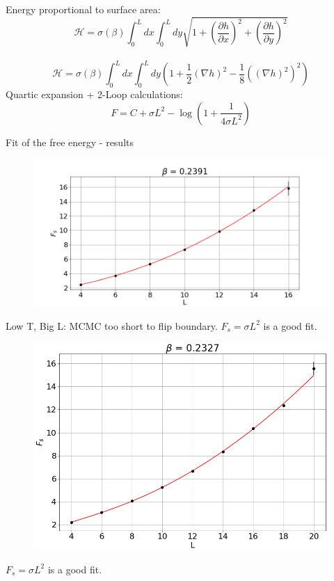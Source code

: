 \documentclass[12pt,handout]{beamer}
\begin{document}
\begin{frame}

\begin{center}
Energy proportional to surface area:
\[
\mathcal H = \sigma\left(\beta \right) \int _0 ^{L} dx \int _0 ^{L} dy \sqrt{1 + \left(\frac{\partial h}{\partial x}\right)^2 + \left(\frac{\partial h}{\partial y}\right)^2}
\]\\
\[
	\mathcal H  = \sigma\left(\beta \right) \int _0 ^{L} dx \int _0 ^{L} dy \left( 1 + \frac{1}{2}\left(\nabla{h}\right) ^2 - \frac{1}{8}\left(\left(\nabla{h}\right) ^2\right) ^2 \right)
\]
Quartic expansion + 2-Loop calculations:
\[
F = C + \sigma L ^2 - \log\left( 1 + \frac{1}{4\sigma L^2}\right)
\]
\end{center}
\end{frame}

\begin{frame}{Fit of the free energy - results}\begin{center}
\begin{figure}[!htb]
\centering
\includegraphics[scale=0.4, center]{02391.png}
\end{figure}
Low T, Big L: MCMC too short to flip boundary. $F_s = \sigma L^2$ is a good fit.
\end{center}
\end{frame}

\begin{frame}
\begin{center}
\begin{figure}[!htb]
\centering
\includegraphics[scale=0.4, center]{02327.png}
\end{figure}
$F_s = \sigma L^2$ is a good fit.
\end{center}
\end{frame}
\end{document}
